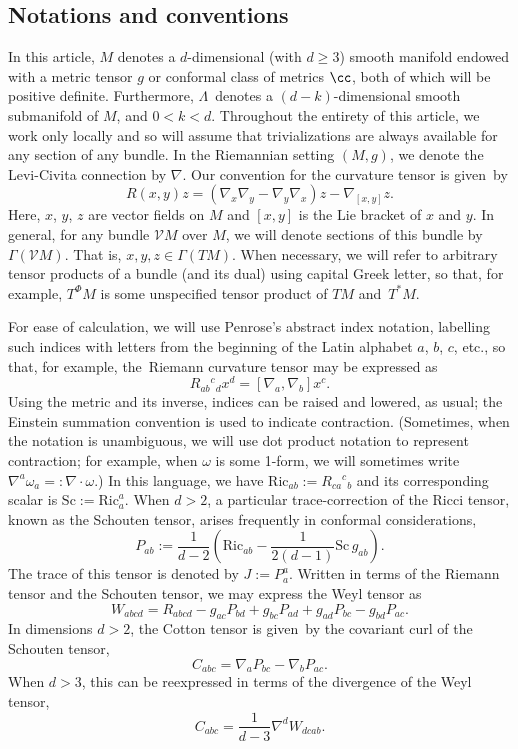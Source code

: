 \setcounter{section}{1}\setcounter{subsection}{0}
\subsection{Notations and conventions}
In this article, $M$ denotes a $d$-dimensional (with $d \geq 3$) smooth manifold endowed with a metric tensor $g$ or conformal class of metrics $\cc$, both of which will be positive definite. Furthermore, $\Lambda$~denotes a $(d-k)$-dimensional smooth submanifold of $M$, and $0 < k < d$. Throughout the entirety of this article, we work only locally and so will assume that trivializations are always available for any section of any bundle. In the Riemannian setting $(M,g)$, we denote the Levi-Civita connection by $\nabla$. Our convention for the curvature tensor is given~by
\[
R(x,y)z = (\nabla_x \nabla_y - \nabla_y \nabla_x)z - \nabla_{[x,y]} z .
\]
Here, $x$, $y$, $z$ are vector fields on $M$ and $[x,y]$ is the Lie bracket of $x$ and $y$. In general, for any bundle $\mathcal{V}M$ over $M$, we will denote sections of this bundle by $\Gamma(\mathcal{V} M)$. That is, $x,y,z \in \Gamma(TM)$. When necessary, we will refer to arbitrary tensor products of a bundle (and its dual) using capital Greek letter, so that, for example, $T^\Phi M$ is some unspecified tensor product of $TM$ and~$T^* M$.

For ease of calculation, we will use Penrose's abstract index notation, labelling such indices with letters from the beginning of the Latin alphabet $a$, $b$, $c$, etc., so that, for example, the~Riemann curvature tensor may be expressed as
\[
R_{ab}{}^c{}_d x^d = [\nabla_a, \nabla_b] x^c .
\]
Using the metric and its inverse, indices can be raised and lowered, as usual; the Einstein summation convention is used to indicate contraction. (Sometimes, when the notation is unambiguous, we will use dot product notation to represent contraction; for example, when $\omega$ is some 1-form, we will sometimes write $\nabla^a \omega_a =: \nabla \cdot \omega$.) In this language, we have $\mathrm{Ric}_{ab} := R_{ca}{}^c{}_b$ and its corresponding scalar is $\mathrm{Sc} := \mathrm{Ric}_a^a$. When $d > 2$, a particular trace-correction of the Ricci tensor, known as the Schouten tensor, arises frequently in conformal considerations,
\[
P_{ab} := \frac{1}{d-2} \left(\mathrm{Ric}_{ab} - \frac{1}{2(d-1)} \mathrm{Sc}\, g_{ab} \right) .
\]
The trace of this tensor is denoted by $J := P_a^a$. Written in terms of the Riemann tensor and the Schouten tensor, we may express the Weyl tensor as
\[
W_{abcd} = R_{abcd} - g_{ac} P_{bd} + g_{bc} P_{ad} + g_{ad} P_{bc} - g_{bd} P_{ac} .
\]
In dimensions $d > 2$, the Cotton tensor is given~by the covariant curl of the Schouten tensor,
\[
C_{abc} = \nabla_a P_{bc} - \nabla_b P_{ac} .
\]
When $d > 3$, this can be reexpressed in terms of the divergence of the Weyl tensor,
\[
C_{abc} = \frac{1}{d-3} \nabla^d W_{dcab} .
\]


